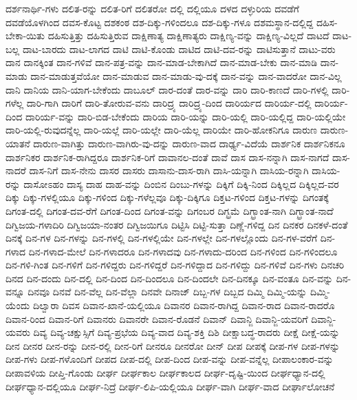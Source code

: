 {ದರ್ಶನಾರ್ಥಿ-ಗಳು
ದಲಿತ-ರನ್ನು
ದಲಿತ-ರಿಗೆ
ದಲಿತರೋ
ದಲ್ಲಿ
ದಲ್ಲಿಯೂ
ದಳದ
ದಳ್ಳುರಿಯ
ದವಡೆಗೆ
ದವಡೆಯೊಳಗಿಂದ
ದವಸ-ಕೊಟ್ಟ
ದಶಕಂಠ
ದಶ-ದಿಕ್ಕು-ಗಳಿಂದಲೂ
ದಶ-ದಿಕ್ಕು-ಗಳೂ
ದಶಮಸ್ಥಾನ-ದಲ್ಲಿದ್ದ
ದಹಿಸ-ಬೇಕಾ-ಯಿತು
ದಹಿಸುತ್ತಿತ್ತು
ದಹಿಸುತ್ತಿರುವ
ದಾಕ್ಷಿಣಾತ್ಯ
ದಾಕ್ಷಿಣಾತ್ಯರು
ದಾಕ್ಷಿಣ್ಯ-ವನ್ನು
ದಾಕ್ಷಿಣ್ಯ-ವಿಲ್ಲದೆ
ದಾಟದೆ
ದಾಟ-ಬಲ್ಲ
ದಾಟ-ಬಾರದು
ದಾಟ-ಲಾಗದ
ದಾಟಿ
ದಾಟಿ-ಕೊಂಡು
ದಾಟಿದ
ದಾಟಿ-ದವ-ರನ್ನು
ದಾಟಿಸುತ್ತಾನೆ
ದಾಟು-ವರು
ದಾನ
ದಾನಕ್ಕಿಂತ
ದಾನ-ಗಳಿವೆ
ದಾನ-ಪತ್ರ-ವನ್ನು
ದಾನ-ಮಾಡ-ಬೇಕಾಗಿದೆ
ದಾನ-ಮಾಡ-ಬೇಕು
ದಾನ-ಮಾಡಿ
ದಾನ-ಮಾಡು
ದಾನ-ಮಾಡುತ್ತವೆಯೋ
ದಾನ-ಮಾಡುವ
ದಾನ-ಮಾಡು-ವು-ದಕ್ಕೆ
ದಾನ-ವನ್ನು
ದಾನ-ವಾದರೋ
ದಾನ-ವಿಲ್ಲ
ದಾನಿ
ದಾನಿಯ
ದಾನಿ-ಯಾಗ-ಬೇಕೆಂದು
ದಾಬೂಲ್
ದಾರ-ದಂತೆ
ದಾರ-ವನ್ನು
ದಾರಿ
ದಾರಿ-ಕಾಣದೆ
ದಾರಿ-ಗಳಲ್ಲಿ
ದಾರಿ-ಗಳೆಲ್ಲ
ದಾರಿ-ಗಾಗಿ
ದಾರಿಗೆ
ದಾರಿ-ತೋರುವ-ವನು
ದಾರಿದ್ರ್ಯ
ದಾರಿದ್ರ್ಯ-ದಿಂದ
ದಾರಿರ್ಯದ
ದಾರಿರ್ಯ-ದಲ್ಲಿ
ದಾರಿರ್ಯ-ದಿಂದ
ದಾರಿರ್ಯ-ವನ್ನು
ದಾರಿ-ಬಿಡ-ಬೇಕೆಂದು
ದಾರಿಯ
ದಾರಿ-ಯನ್ನು
ದಾರಿ-ಯಲ್ಲಿ
ದಾರಿ-ಯಲ್ಲಿದ್ದ
ದಾರಿ-ಯಲ್ಲಿಯೇ
ದಾರಿ-ಯಲ್ಲಿ-ರುವುದನ್ನೆಲ್ಲ
ದಾರಿ-ಯಲ್ಲೆ
ದಾರಿ-ಯಲ್ಲೇ
ದಾರಿ-ಯೆಲ್ಲ
ದಾರಿಯೇ
ದಾರಿ-ಹೋಕನಿಗೂ
ದಾರುಣ
ದಾರುಣ-ಯಾತನೆ
ದಾರುಣ-ವಾಗಿತ್ತು
ದಾರುಣ-ವಾಗಿರು-ವು-ದನ್ನು
ದಾರುಣ-ವಾದ
ದಾರ್ಢ್ಯ-ವಿದೆಯೆ
ದಾರ್ಶನಿಕ
ದಾರ್ಶನಿಕನೂ
ದಾರ್ಶನಿಕರ
ದಾರ್ಶನಿಕ-ರಾಗಿದ್ದರೂ
ದಾರ್ಶನಿಕ-ರಿಗೆ
ದಾವಾನಲ-ದಂತೆ
ದಾವೆ
ದಾಸ
ದಾಸ-ನನ್ನಾಗಿ
ದಾಸ-ನಾಗದೆ
ದಾಸ-ನಾದರೆ
ದಾಸ-ನಿಗೆ
ದಾಸ-ನೇನು
ದಾಸರ
ದಾಸರು
ದಾಸಾನು-ದಾಸ-ರಾಗಿ
ದಾಸಿ-ಯನ್ನಾಗಿ
ದಾಸಿಯ-ರನ್ನಾಗಿ
ದಾಸಿಯ-ರನ್ನು
ದಾಸೋಽಹಂ
ದಾಸ್ಯ
ದಾಹ
ದಾಹ-ವನ್ನು
ದಿಂಬಿನ
ದಿಂಬು-ಗಳನ್ನು
ದಿಕ್ಕಿಗೆ
ದಿಕ್ಕಿ-ನಿಂದ
ದಿಕ್ಕಿಲ್ಲದ
ದಿಕ್ಕಿಲ್ಲದ-ವರ
ದಿಕ್ಕು
ದಿಕ್ಕು-ಗಳಲ್ಲಿಯೂ
ದಿಕ್ಕು-ಗಳಿಂದ
ದಿಕ್ಕು-ಗಳೆಲ್ಲವೂ
ದಿಕ್ಕು-ದಿಕ್ಕಿಗೂ
ದಿಕ್ತಟ-ಗಳಿಂದ
ದಿಕ್ತಟ-ಗಳನ್ನು
ದಿಗಂತಕ್ಕೆ
ದಿಗಂತ-ದಲ್ಲಿ
ದಿಗಂತ-ದವ-ರೆಗೆ
ದಿಗಂತ-ದಿಂದ
ದಿಗಂತ-ವನ್ನು
ದಿಗಂಬರ
ದಿಗ್ಭ್ರಮೆ
ದಿಗ್ಭ್ರಾಂತ-ನಾಗಿ
ದಿಗ್ಭ್ರಾಂತ-ನಾದೆ
ದಿಗ್ವಿಜಯ-ಗಳಾದಿರಿ
ದಿಗ್ವಿಜಯಾ-ನಂತರ
ದಿಗ್ವಿಜಯಿಗೂ
ದಿಟ್ಟಿಸಿ
ದಿಟ್ಟಿ-ಸುತ್ತಾ
ದಿಣ್ಣೆ-ಗಳಿದ್ದ
ದಿನ
ದಿನಕರ
ದಿನಕಳೆ-ದಂತೆ
ದಿನಕ್ಕೆ
ದಿನ-ಗಳ
ದಿನ-ಗಳನ್ನು
ದಿನ-ಗಳಲ್ಲಿ
ದಿನ-ಗಳಲ್ಲಿಯೇ
ದಿನ-ಗಳಲ್ಲೇ
ದಿನ-ಗಳಲ್ಲೊಂದು
ದಿನ-ಗಳ-ವರೆಗೆ
ದಿನ-ಗಳಾದ
ದಿನ-ಗಳಾದ-ಮೇಲೆ
ದಿನ-ಗಳಾದರೂ
ದಿನ-ಗಳಾದವು
ದಿನ-ಗಳಾದು-ದರಿಂದ
ದಿನ-ಗಳಿಂದ
ದಿನ-ಗಳಿಂದಲೂ
ದಿನ-ಗಳಿ-ಗಿಂತ
ದಿನ-ಗಳಿಗೆ
ದಿನ-ಗಳಿದ್ದರು
ದಿನ-ಗಳಿದ್ದರೆ
ದಿನ-ಗಳಿದ್ದಾದ
ದಿನ-ಗಳಿದ್ದು
ದಿನ-ಗಳಿವೆ
ದಿನ-ಗಳು
ದಿನಚರಿ
ದಿನದ
ದಿನ-ದಂದು
ದಿನ-ದಲ್ಲಿ
ದಿನ-ದಿಂದ
ದಿನ-ದಿಂದಲೂ
ದಿನ-ದಿಂದಲೇ
ದಿನ-ದಿನಕ್ಕೂ
ದಿನ-ವಂತೂ
ದಿನ-ವನ್ನು
ದಿನ-ವನ್ನೂ
ದಿನವೂ
ದಿನವೆ
ದಿನ-ವೆಲ್ಲ
ದಿನ-ವೆಲ್ಲಾ
ದಿನವೇ
ದಿನಾಜ್
ದಿಬ್ಬ-ಗಳ
ದಿಬ್ಬದ
ದಿಮ್ಮಿ
ದಿಮ್ಮಿ-ಯನ್ನು
ದಿಮ್ಮಿ-ಯೆಂದು
ದಿಲ್ವಾರಾ
ದಿವಸ
ದಿವಾನ-ಖಾನೆ-ಯಲ್ಲಿಯೂ
ದಿವಾನರ
ದಿವಾನ-ರಾಗಿದ್ದ
ದಿವಾನ-ರಾದ
ದಿವಾನ-ರಾದರೊ
ದಿವಾನ-ರಿಂದ
ದಿವಾನ-ರಿಗೆ
ದಿವಾನರು
ದಿವಾನರೇ
ದಿವಾನ-ರೊಡನೆ
ದಿವಾನ್
ದಿವಾನ್ಜಿ
ದಿವಾನ್ಜಿ-ಯವರಿಗೆ
ದಿವಾನ್ಜಿ-ಯವರು
ದಿವ್ಯ
ದಿವ್ಯ-ಚಕ್ಷುಸ್ಸಿಗೆ
ದಿವ್ಯ-ಪ್ರಭೆಯ
ದಿವ್ಯ-ವಾದ
ದಿವ್ಯ-ಶಕ್ತಿ
ದಿಶಿ
ದೀಕ್ಷಾಬದ್ಧ-ರಾದರು
ದೀಕ್ಷೆ
ದೀಕ್ಷೆ-ಯನ್ನು
ದೀನ
ದೀನರ
ದೀನ-ರನ್ನು
ದೀನ-ರಲ್ಲಿ
ದೀನ-ರಿಗೆ
ದೀನರೂ
ದೀನರೋ
ದೀನ್
ದೀಪ
ದೀಪಕ್ಕೆ
ದೀಪ-ಗಳ
ದೀಪ-ಗಳನ್ನು
ದೀಪ-ಗಳು
ದೀಪ-ಗಳೊಂದಿಗೆ
ದೀಪದ
ದೀಪ-ದಲ್ಲಿ
ದೀಪ-ದಿಂದ
ದೀಪ-ವನ್ನು
ದೀಪ-ವನ್ನೆಲ್ಲ
ದೀಪಾಲಂಕಾರ-ವನ್ನು
ದೀಪಾವಳಿಯ
ದೀಪ್ತಿ-ಗೊಂಡು
ದೀರ್ಘ
ದೀರ್ಘಕಾಲ
ದೀರ್ಘಕಾಲದ
ದೀರ್ಘ-ದೃಷ್ಟಿ-ಯಿಂದ
ದೀರ್ಘಧ್ಯಾನ-ದಲ್ಲಿ
ದೀರ್ಘಧ್ಯಾನ-ದಲ್ಲಿಯೂ
ದೀರ್ಘ-ನಿದ್ರೆ
ದೀರ್ಘ-ಲಿಪಿ-ಯಲ್ಲಿಯೂ
ದೀರ್ಘ-ವಾಗಿ
ದೀರ್ಘ-ವಾದ
ದೀರ್ಘಾಲೋಚನೆ
}
